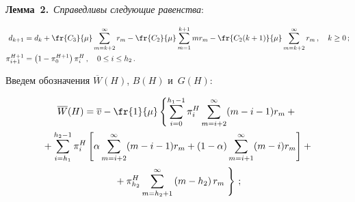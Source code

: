   


  \noindent


  \textbf{Лемма~2.}\ \textit{Справедливы следующие равенства}:


  \begin{align*}


  d_{k+1}&= d_k +\fr{C_3}{\mu}\sum\limits^\infty_{m=k+2} r_m-


\fr{C_2}{\mu}\sum\limits_{m=1}^{k+1} mr_m-\fr{C_2(k+1)}{\mu} 


\sum\limits_{m=k+2}^\infty r_m\,,\quad k\geq 0\,;




\\


  \pi_{i+1}^{H+1} &= \left( 1-\pi_0^{H+1} \right) \pi_i^H\,,\quad 0\leq i\leq h_2\,.


  \notag




  \end{align*}


  Введем обозначения $\overline{W}(H)$, $B(H)$ и~$G(H)$:


  \begin{multline}


  \overline{W}(H) =\overline{v} -\fr{1}{\mu}\left\{ \sum\limits_{i=0}^{h_1-1} 


\pi_i^H \sum\limits_{m=i+2}^\infty (m-i-1)r_m+{}\right.\\


{}+ \sum\limits_{i=h_1}^{h_2-1} 


\pi_i^H \left[ \alpha \sum\limits_{m=i+2}^\infty (m-i-1)r_m +(1-\alpha) 


\sum\limits_{m=i+1}^\infty (m-i)r_m\right] + {}\\


{}+\pi^H_{h_2} 


\sum\limits_{m=h_2+1}^\infty 


\left(m-h_2\right)r_m


\left. \vphantom{\sum\limits_{i=0}^{h_1-1}} 


\right\}\,;


  \label{e12-ag}


  \end{multline}


  


  \vspace*{-12pt}


  


